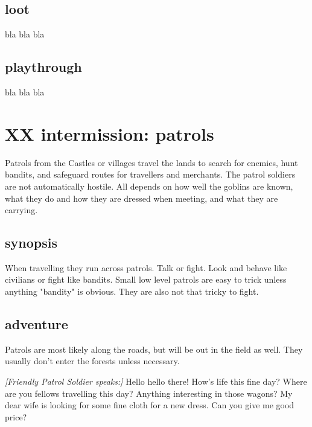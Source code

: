 \subsection*{loot}

bla bla bla


\subsection*{playthrough}

bla bla bla












\newpage
\section*{XX intermission: patrols}


Patrols from the Castles or villages travel the lands to search for enemies, hunt bandits, and safeguard routes for travellers and merchants. The patrol soldiers are not automatically hostile. All depends on how well the goblins are known, what they do and how they are dressed when meeting, and what they are carrying.


\subsection*{synopsis}

When travelling they run across patrols. Talk or fight. Look and behave like civilians or fight like bandits. Small low level patrols are easy to trick unless anything "bandity" is obvious. They are also not that tricky to fight.


\subsection*{adventure}

Patrols are most likely along the roads, but will be out in the field as well. They usually don't enter the forests unless necessary.

\begin{readoutloud}
\emph{[Friendly Patrol Soldier speaks:]}
Hello hello there! How's life this fine day? Where are you fellows travelling this day? Anything interesting in those wagons? My dear wife is looking for some fine cloth for a new dress. Can you give me good price?
\end{readoutloud}

